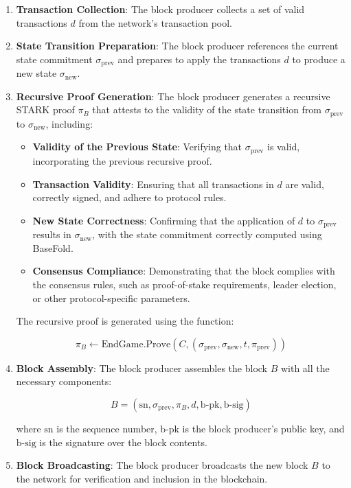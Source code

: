 \documentclass{article}
\theoremstyle{plain}
\theoremstyle{definition}
\theoremstyle{remark}
\theoremstyle{problem}
\begin{document}
\begin{enumerate}
    \item \textbf{Transaction Collection}: The block producer collects a set of valid transactions $d$ from the network's transaction pool.

    \item \textbf{State Transition Preparation}: The block producer references the current state commitment $\sigma_{\text{prev}}$ and prepares to apply the transactions $d$ to produce a new state $\sigma_{\text{new}}$.

    \item \textbf{Recursive Proof Generation}: The block producer generates a recursive STARK proof $\pi_B$ that attests to the validity of the state transition from $\sigma_{\text{prev}}$ to $\sigma_{\text{new}}$, including:

    \begin{itemize}
        \item \textbf{Validity of the Previous State}: Verifying that $\sigma_{\text{prev}}$ is valid, incorporating the previous recursive proof.

        \item \textbf{Transaction Validity}: Ensuring that all transactions in $d$ are valid, correctly signed, and adhere to protocol rules.

        \item \textbf{New State Correctness}: Confirming that the application of $d$ to $\sigma_{\text{prev}}$ results in $\sigma_{\text{new}}$, with the state commitment correctly computed using BaseFold.

        \item \textbf{Consensus Compliance}: Demonstrating that the block complies with the consensus rules, such as proof-of-stake requirements, leader election, or other protocol-specific parameters.
    \end{itemize}

    The recursive proof is generated using the function:

    \[
    \pi_B \leftarrow \text{EndGame.Prove}(C, (\sigma_{\text{prev}}, \sigma_{\text{new}}, t, \pi_{\text{prev}}))
    \]

    \item \textbf{Block Assembly}: The block producer assembles the block $B$ with all the necessary components:

    \[
    B = (\text{sn}, \sigma_{\text{prev}}, \pi_B, d, \text{b-pk}, \text{b-sig})
    \]

    where $\text{sn}$ is the sequence number, $\text{b-pk}$ is the block producer's public key, and $\text{b-sig}$ is the signature over the block contents.

    \item \textbf{Block Broadcasting}: The block producer broadcasts the new block $B$ to the network for verification and inclusion in the blockchain.
\end{enumerate}
\end{document}

